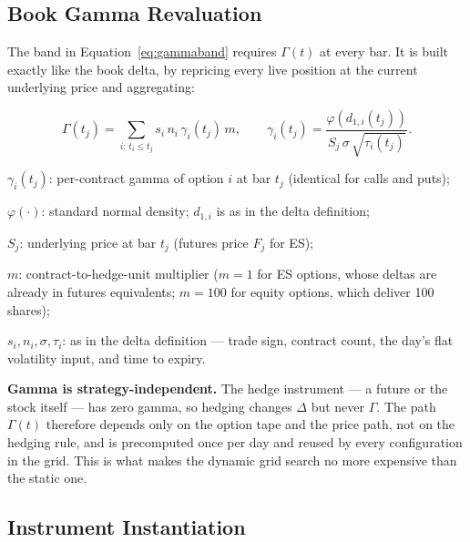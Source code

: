 \documentclass{article}
\begin{document}
\subsection{Book Gamma Revaluation}

The band in Equation~\eqref{eq:gammaband} requires $\Gamma(t)$ at every bar. It is built
exactly like the book delta, by repricing every live position at the current underlying
price and aggregating:

\begin{eqbox}
\begin{equation}
\Gamma(t_j) = \sum_{i:\,t_i \le t_j} s_i \, n_i \, \gamma_i(t_j) \, m,
\qquad
\gamma_i(t_j) = \frac{\varphi\!\left(d_{1,i}(t_j)\right)}
                     {S_j\,\sigma\,\sqrt{\tau_i(t_j)}}.
\label{eq:gamma}
\end{equation}
\end{eqbox}

\begin{vardefs}
\item $\gamma_i(t_j)$: per-contract gamma of option $i$ at bar $t_j$ (identical for calls
  and puts);
\item $\varphi(\cdot)$: standard normal density; $d_{1,i}$ is as in the delta definition;
\item $S_j$: underlying price at bar $t_j$ (futures price $F_j$ for ES);
\item $m$: contract-to-hedge-unit multiplier ($m = 1$ for ES options, whose deltas are
  already in futures equivalents; $m = 100$ for equity options, which deliver 100 shares);
\item $s_i, n_i, \sigma, \tau_i$: as in the delta definition --- trade sign, contract
  count, the day's flat volatility input, and time to expiry.
\end{vardefs}

\textbf{Gamma is strategy-independent.} The hedge instrument --- a future or the stock
itself --- has zero gamma, so hedging changes $\Delta$ but never $\Gamma$. The path
$\Gamma(t)$ therefore depends only on the option tape and the price path, not on the
hedging rule, and is precomputed once per day and reused by every configuration in the
grid. This is what makes the dynamic grid search no more expensive than the static one.

\subsection{Instrument Instantiation}
\end{document}
